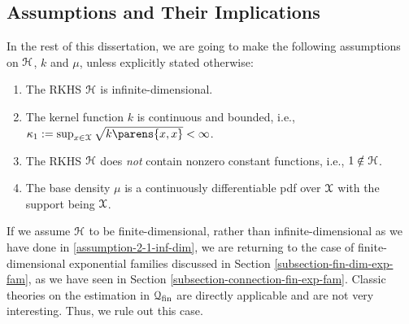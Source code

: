 %
%	


\subsection{Assumptions and Their Implications}

In the rest of this dissertation, we are going to make the following assumptions on $\mathcal{H}$, $k$ and $\mu$, unless explicitly stated otherwise: 
\begin{enumerate}[label=\textbf{(A\arabic*)}]
	\item \label{assumption-2-1-inf-dim} The RKHS $\mathcal{H}$ is infinite-dimensional. 
	\item \label{assumption-2-2-bdd-kernel} The kernel function $k$ is continuous and bounded, i.e., $\kappa_1 := \sup_{x \in \calX} \sqrt{k \parens{x, x}} < \infty$. 
	\item \label{assumption-2-3-no-const-fun} The RKHS $\mathcal{H}$ does \emph{not} contain nonzero constant functions, i.e., $1 \notin \mathcal{H}$. 
	\item \label{assumption-2-4-base-density} The base density $\mu$ is a continuously differentiable pdf over $\mathcal{X}$ with the support being $\mathcal{X}$. 
\end{enumerate}

If we assume $\mathcal{H}$ to be finite-dimensional, rather than infinite-dimensional as we have done in \ref{assumption-2-1-inf-dim}, we are returning to the case of finite-dimensional exponential families discussed in Section \ref{subsection-fin-dim-exp-fam}, as we have seen in Section \ref{subsection-connection-fin-exp-fam}. Classic theories on the estimation in $\mathcal{Q}_{\mathrm{fin}}$ are directly applicable and are not very interesting. Thus, we rule out this case. 


